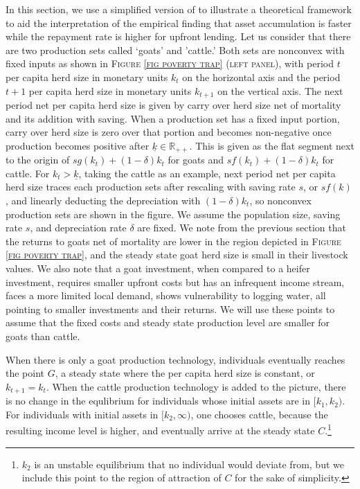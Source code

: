 \vspace{2ex}
	In this section, we use a simplified version of \citet{GalorZeira1993} to illustrate a theoretical framework to aid the interpretation of the empirical finding that asset accumulation is faster while the repayment rate is higher for upfront lending. Let us consider that there are two production sets called `goats' and 'cattle.' Both sets are nonconvex with fixed inputs as shown in \textsc{\small Figure \ref{fig poverty trap} (left panel)}, with period $t$ per capita herd size in monetary units $k_{t}$ on the horizontal axis and the period $t+1$ per capita herd size in monetary units $k_{t+1}$ on the vertical axis. The next period net per capita herd size is given by carry over herd size net of mortality and its addition with saving. When a production set has a fixed input portion, carry over herd size is zero over that portion and becomes non-negative once production becomes positive after $\underline{k}\in\mathbb R_{++}$. This is given as the flat segment next to the origin of $sg(k_{t})+(1-\delta)k_{t}$ for goats and $sf(k_{t})+(1-\delta)k_{t}$ for cattle. For $k_{t}>\underline{k}$, taking the cattle as an example, next period net per capita herd size traces each production sets after rescaling with saving rate $s$, or $sf(k)$, and linearly deducting the depreciation with $(1-\delta)k_{t}$, so nonconvex production sets are shown in the figure. We assume the population size, saving rate $s$, and depreciation rate $\delta$ are fixed. We note from the previous section that the returns to goats net of mortality are lower in the region depicted in \textsc{\small Figure \ref{fig poverty trap}}, and the steady state goat herd size is small in their livestock values. We also note that a goat investment, when compared to a heifer investment, requires smaller upfront costs but has an infrequent income stream, faces a more limited local demand, shows vulnerability to logging water, all pointing to smaller investments and their returns. We will use these points to assume that the fixed costs and steady state production level are smaller for goats than cattle.

	When there is only a goat production technology, individuals eventually reaches the point $G$, a steady state where the per capita herd size is constant, or $k_{t+1}=k_{t}$. When the cattle production technology is added to the picture, there is no change in the equlibrium for individuals whose initial assets are in $[k_{1}, k_{2})$. For individuals with initial assets in $[k_{2}, \infty)$, one chooses cattle, because the resulting income level is higher, and eventually arrive at the steady state $C$.\footnote{$k_{2}$ is an unstable equilibrium that no individual would deviate from, but we include this point to the region of attraction of $C$ for the sake of simplicity. } 

